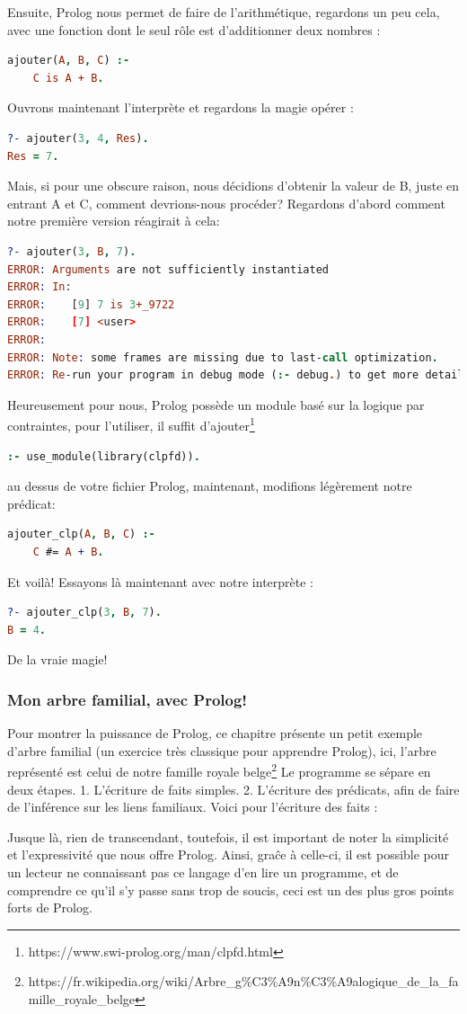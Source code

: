 \documentclass[a4paper, 12pt]{article}
\numberwithin{equation}{subsection}
\begin{document}
Ensuite, Prolog nous permet de faire de l'arithmétique, regardons un peu cela, avec une fonction dont le seul rôle est d'additionner deux nombres :
\begin{lstlisting}[language=Prolog]
ajouter(A, B, C) :-
    C is A + B.
\end{lstlisting}
Ouvrons maintenant l'interprète et regardons la magie opérer :
\begin{lstlisting}[language=Prolog]
?- ajouter(3, 4, Res).
Res = 7.
\end{lstlisting}
Mais, si pour une obscure raison, nous décidions d'obtenir la valeur de B, juste en entrant A et C, comment devrions-nous procéder? Regardons d'abord comment notre première version réagirait à cela:
\begin{lstlisting}[language=Prolog]
?- ajouter(3, B, 7).
ERROR: Arguments are not sufficiently instantiated
ERROR: In:
ERROR:    [9] 7 is 3+_9722
ERROR:    [7] <user>
ERROR:
ERROR: Note: some frames are missing due to last-call optimization.
ERROR: Re-run your program in debug mode (:- debug.) to get more detail.
\end{lstlisting}
Heureusement pour nous, Prolog possède un module basé sur la logique par contraintes, pour l'utiliser, il suffit d'ajouter\footnote{https://www.swi-prolog.org/man/clpfd.html}
\begin{lstlisting}[language=Prolog]
:- use_module(library(clpfd)).
\end{lstlisting}
au dessus de votre fichier Prolog, maintenant, modifions légèrement notre prédicat:
\begin{lstlisting}[language=Prolog]
ajouter_clp(A, B, C) :-
    C #= A + B.
\end{lstlisting}
Et voilà! Essayons là maintenant avec notre interprète :
\begin{lstlisting}[language=Prolog]
?- ajouter_clp(3, B, 7).
B = 4.
\end{lstlisting}
De la vraie magie!
\subsubsection{Mon arbre familial, avec Prolog!}
Pour montrer la puissance de Prolog, ce chapitre présente un petit exemple d'arbre familial (un exercice très classique pour apprendre Prolog), ici, l'arbre représenté est celui de notre famille royale belge\footnote{https://fr.wikipedia.org/wiki/Arbre\_g\%C3\%A9n\%C3\%A9alogique\_de\_la\_famille\_royale\_belge}
Le programme se sépare en deux étapes.
1. L'écriture de faits simples.
2. L'écriture des prédicats, afin de faire de l'inférence sur les liens familiaux.
Voici pour l'écriture des faits :

Jusque là, rien de transcendant, toutefois, il est important de noter la simplicité et l'expressivité que nous offre Prolog. Ainsi, graĉe à celle-ci, il est possible pour un lecteur ne connaissant pas ce langage d'en lire un programme, et de comprendre ce qu'il s'y passe sans trop de soucis, ceci est un des plus gros points forts de Prolog. \\
\end{document}
